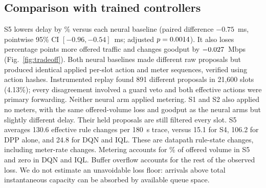 \documentclass[conference]{IEEEtran}
\begin{document}
\subsection{Comparison with trained controllers}
S5 lowers delay by \AuditNeuralReduction\% versus each neural baseline (paired difference \(-0.75\)~ms, pointwise 95\% CI \([-0.96,-0.54]\)~ms; adjusted \(p=0.0014\)). It also loses \AuditNeuralLossDelta{} percentage points more offered traffic and changes goodput by \(-0.027\)~Mbps (Fig.~\ref{fig:tradeoff}). Both neural baselines made different raw proposals but produced identical applied per-slot action and meter sequences, verified using action hashes. Instrumented replay found 891 different proposals in 21,600 slots (4.13\%); every disagreement involved a guard veto and both effective actions were primary forwarding. Neither neural arm applied metering. S1 and S2 also applied no meters, with the same offered-volume loss and goodput as the neural arms but slightly different delay. Their held proposals are still filtered every slot. S5 averages 130.6 effective rule changes per 180~s trace, versus 15.1 for S4, 106.2 for DPP alone, and 24.8 for DQN and IQL. These are datapath rule-state changes, including meter-rate changes. Metering accounts for \AuditMeterShare\% of offered volume in S5 and zero in DQN and IQL. Buffer overflow accounts for the rest of the observed loss. We do not estimate an unavoidable loss floor: arrivals above total instantaneous capacity can be absorbed by available queue space.
\end{document}
